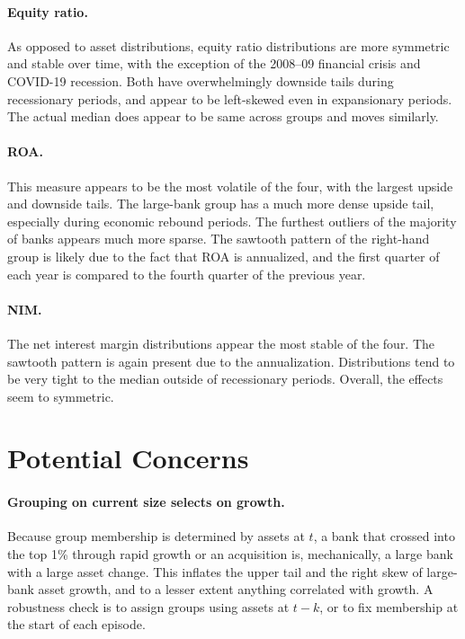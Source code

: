\documentclass[11pt]{article}
\begin{document}
\paragraph{Equity ratio.}
As opposed to asset distributions, equity ratio distributions are more symmetric and stable over time, with the exception of the 2008--09 financial crisis and COVID-19 recession. Both have overwhelmingly downside tails during recessionary periods, and appear to be left-skewed even in expansionary periods. The actual median does appear to be same across groups and moves similarly.

\paragraph{ROA.} 
This measure appears to be the most volatile of the four, with the largest upside and downside tails. The large-bank group has a much more dense upside tail, especially during economic rebound periods. The furthest outliers of the majority of banks appears much more sparse. The sawtooth pattern of the right-hand group is likely due to the fact that ROA is annualized, and the first quarter of each year is compared to the fourth quarter of the previous year. 

\paragraph{NIM.} 
The net interest margin distributions appear the most stable of the four. The sawtooth pattern is again present due to the annualization. Distributions tend to be very tight to the median outside of recessionary periods. Overall, the effects seem to symmetric.

\section*{Potential Concerns}

\paragraph{Grouping on current size selects on growth.}
Because group membership is determined by assets at $t$, a bank that crossed into the top 1\% through rapid growth or an acquisition is, mechanically, a large bank with a large asset change. This inflates the upper tail and the right skew of large-bank asset growth, and to a lesser extent anything correlated with growth. A robustness check is to assign groups using assets at $t-k$, or to fix membership at the start of each episode.
\end{document}
